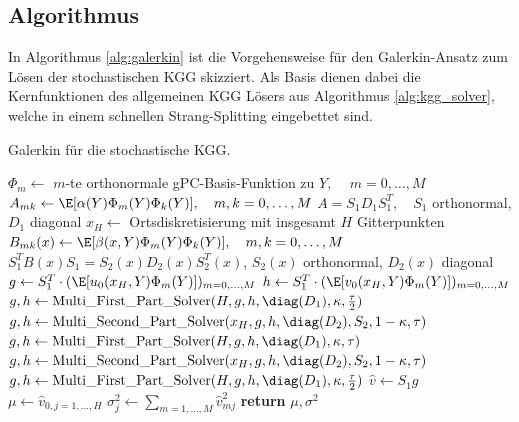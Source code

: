 \subsection{Algorithmus}
In Algorithmus \ref{alg:galerkin} ist die Vorgehensweise für den Galerkin-Ansatz zum Lösen der stochastischen KGG skizziert. Als Basis dienen dabei die Kernfunktionen des allgemeinen KGG Lösers aus Algorithmus \ref{alg:kgg_solver}, welche in einem schnellen Strang-Splitting eingebettet sind.
\begin{algorithm}[ht]
    \caption{Galerkin für die stochastische KGG.}
    \label{alg:galerkin}
    \begin{algorithmic}[1] %
            	\State $\Phi_m\gets$ $m$-te orthonormale gPC-Basis-Funktion zu $Y$, $\quad m=0,\dots,M$
              \State $A_{mk}\gets \E[\alpha(Y)\Phi_m(Y)\Phi_k(Y)],\quad m,k=0,\dots,M$
              \State $A=S_1D_1S_1^T, \quad S_1$ orthonormal, $D_1$ diagonal
              \State $x_H\gets$ Ortsdiskretisierung mit insgesamt $H$ Gitterpunkten
              	\State $B_{mk}(x)\gets \E[\beta(x,Y)\Phi_m(Y)\Phi_k(Y)],\quad m,k=0,\dots,M$
              	\State $S_1^TB(x)S_1=S_2(x)D_2(x)S_2^T(x)$, $S_2(x)$ orthonormal, $D_2(x)$ diagonal
              \EndFor
              \State
              \State $g\gets S_1^T\cdot (\E[u_0(x_H,Y)\Phi_m(Y)])_{m=0,\dots,M}$
              \State $h\gets S_1^T\cdot (\E[v_0(x_H,Y)\Phi_m(Y)])_{m=0,\dots,M}$
              \State $g,h\gets \text{Multi\_First\_Part\_Solver}(H, g, h, \diag(D_1), \kappa, \frac{\tau}{2})$
            \State $g,h\gets \text{Multi\_Second\_Part\_Solver}(x_H, g, h, \diag(D_2), S_2, 1-\kappa, \tau)$
              
            	\State $g,h\gets \text{Multi\_First\_Part\_Solver}(H, g, h, \diag(D_1), \kappa, \tau)$
            \State $g,h\gets \text{Multi\_Second\_Part\_Solver}(x_H, g, h, \diag(D_2), S_2, 1-\kappa, \tau)$
            \EndFor
            \State $g,h\gets \text{Multi\_First\_Part\_Solver}(H, g, h, \diag(D_1), \kappa, \frac{\tau}{2})$
            \State
            \State $\hat{v}\gets S_1g$  
            \State $\mu\gets \hat{v}_{0,j=1,\dots,H}$ 
			\State $\sigma^2_j\gets \sum_{m=1,\dots,M}\hat{v}^2_{mj}$
			\State \textbf{return} $\mu,\sigma^2$

\end{algorithmic}
\end{algorithm}
